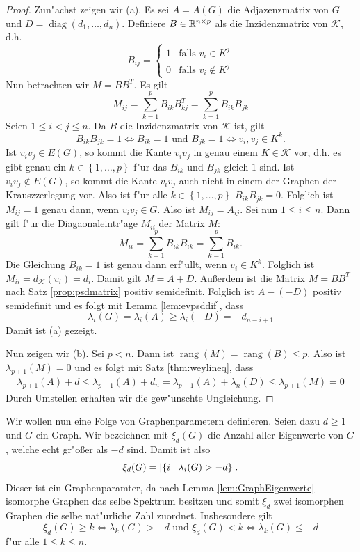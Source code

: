 \begin{proof}
  Zun"achst zeigen wir (a). Es sei $A=A(G)$ die Adjazenzmatrix von $G$ und $D = \operatorname{diag}(d_1,\dots,d_n)$. Definiere $B\in{\mathbb{R}}^{n\times p}$ als die Inzidenzmatrix von $\mathcal K$, d.h. $$B_{ij} = \begin{cases}
    1 & \text{falls } v_i \in K^j \\ 0 & \text{falls }v_i \notin K^j
  \end{cases}$$ 
  Nun betrachten wir $M=BB^{T}$. Es gilt
  \[
    M_{ij} = \sum\limits_{k=1}^{p}B_{ik}B^{T}_{kj} = \sum\limits_{k=1}^{p}B_{ik}B_{jk}
  \]
  Seien $1\leq i < j \leq n$. Da $B$ die Inzidenzmatrix von $\mathcal{K}$ ist, gilt  $$ B_{ik} B_{jk} = 1 \Leftrightarrow B_{ik} = 1 \text{ und } B_{jk} = 1 \Leftrightarrow v_i,v_j \in K^{k}.$$ Ist $v_iv_j \in E(G)$, so kommt die Kante $v_iv_j$ in genau einem $K\in \mathcal{K}$ vor, d.h. es gibt genau ein $k\in \left\{ 1,\dots,p \right\}$ f"ur das $B_{ik}$ und $B_{jk}$ gleich $1$ sind. Ist $v_iv_j\notin E(G)$, so kommt die Kante $v_iv_j$ auch nicht in einem der Graphen der Krauszzerlegung vor.
  Also ist f"ur alle $k\in \left\{ 1,\dots, p \right\}$ $B_{ik}B_{jk} = 0$. Folglich ist $M_{ij}=1$ genau dann, wenn $v_iv_j\in G$. Also ist $M_{ij} = A_{ij}$.
  Sei nun $1\leq i \leq n$. Dann gilt f"ur die Diagaonaleintr"age $M_{ii}$ der Matrix $M$:
  \[
    M_{ii} = \sum\limits_{k=1}^{p}B_{ik}B_{ik} = \sum\limits_{k=1}^{p} B_{ik}.
  \]
  Die Gleichung $B_{ik}=1$ ist genau dann erf"ullt, wenn $v_i \in K^k$. Folglich ist $M_{ii}= d_{\mathcal{K}}(v_i)= d_i$. Damit gilt $M=A+D$. Au{\ss}erdem ist die Matrix $M=BB^{T}$ nach Satz \ref{prop:psdmatrix} positiv semidefinit.
  Folglich ist $A- (-D)$ positiv semidefinit und es folgt mit Lemma \ref{lem:evpsddif}, dass 
  \begin{equation*}
    \lambda_i(G) = \lambda_i(A) \geq \lambda_i(-D) = -d_{n-i+1}
  \end{equation*}
  Damit ist (a) gezeigt.

  Nun zeigen wir (b). Sei $p<n$. Dann ist $\operatorname{rang}(M)= \operatorname{rang}(B) \leq p$. Also ist $\lambda_{p+1}(M) = 0$ und es folgt mit Satz \ref{thm:weylineq}, dass 
  \begin{align*}
    \lambda_{p+1}(A) + d \leq \lambda_{p+1}(A) + d_{n} = \lambda_{p+1}(A) + \lambda_{n} (D) \leq \lambda_{p+1} (M) = 0
  \end{align*}
  Durch Umstellen erhalten wir die gew"unschte Ungleichung.
\end{proof}

Wir wollen nun eine Folge von Graphenparametern definieren. Seien dazu $d\geq 1$ und $G$ ein Graph. Wir bezeichnen mit $\xi_{d}(G)$ die Anzahl aller Eigenwerte von $G$, welche echt gr"o{\ss}er als $-d$ sind. Damit ist also 
$$\xi_{d}(G) = |\{i \;|\; \lambda_i(G) > -d \}|.$$ 
Dieser ist ein Graphenparamter, da nach Lemma \ref{lem:GraphEigenwerte} isomorphe Graphen das selbe Spektrum besitzen und somit $\xi_d $ zwei isomorphen Graphen die selbe nat"urliche Zahl zuordnet. 
Insbesondere gilt
$$\xi_{d}(G) \geq k \Leftrightarrow \lambda_{k}(G) > -d \text{ und } \xi_{d}(G) < k \Leftrightarrow \lambda_{k}(G) \leq -d $$ f"ur alle $1 \leq k \leq n$.

